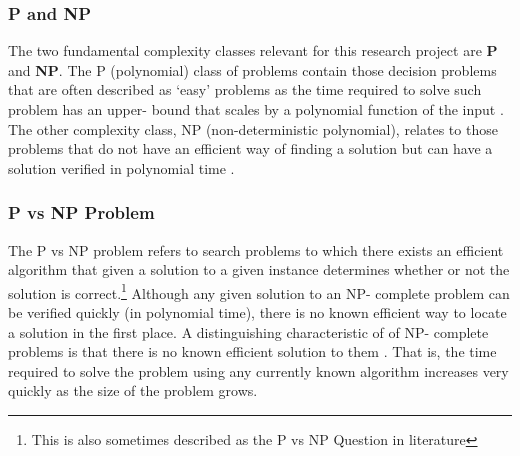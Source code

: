 \documentclass[11pt, a4paper, oneside]{report} %
\begin{document}
\subsubsection{P and NP}

The two fundamental complexity classes relevant for this research project are
\textbf{P} and \textbf{NP}\@. The P (polynomial) class of problems contain those
decision problems that are often described as `easy' problems
\cite{kendall2008survey} as the time required to solve such problem has an
upper- bound that scales by a polynomial function of the input
\cite{sipser2012introduction}. The other complexity class, NP (non-deterministic
polynomial), relates to those problems that do not have an efficient way of
finding a solution but can have a solution verified in polynomial time
\cite{Goldreich:2008, Papadimitriou:2003:CC:1074100.1074233}.





\subsubsection{P vs NP Problem}

The P vs NP problem refers to search problems to which there exists an efficient
algorithm that given a solution to a given instance determines whether or not
the solution is correct\cite{sipser2012introduction,Goldreich:2008,
kendall2008survey,du2011theory}.\footnote{This is also sometimes described as
the P vs NP Question in literature} Although any given solution to an NP-
complete problem can be verified quickly (in polynomial time), there is no known
efficient way to locate a solution in the first place. A distinguishing
characteristic of of NP- complete problems is that there is no known efficient
solution to them \cite{Goldreich:2008}. That is, the time required to solve the
problem using any currently known algorithm increases very quickly as the size
of the problem grows.
\end{document}
